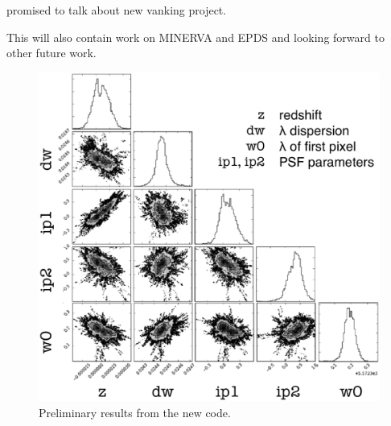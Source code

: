 promised to talk about new vanking project.

This will also contain work on MINERVA and EPDS and looking forward to
other future work.



\begin{figure}
\centering
\includegraphics[scale=0.3]{conclusion/mcmcplot-labeled.eps}
\caption{Preliminary results from the new code.
\label{conclusion:fig:mcmc}}
\end{figure}
